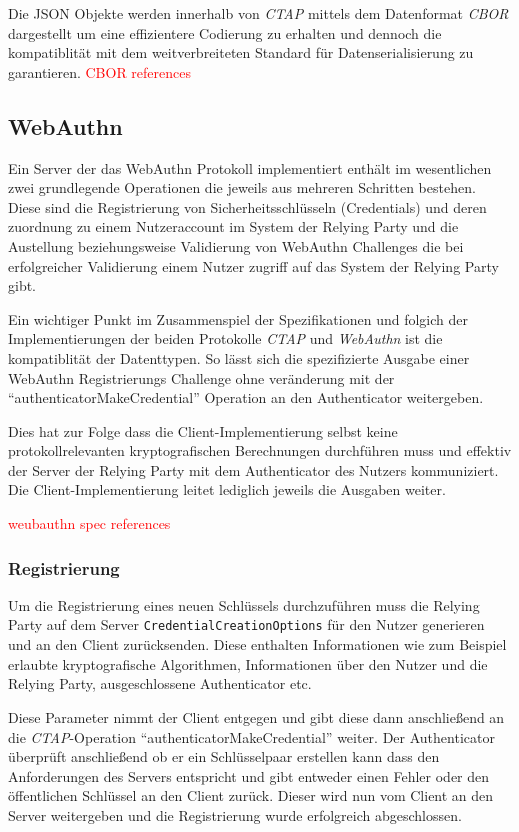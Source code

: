 \documentclass[journal]{IEEEtran}
\begin{document}
Die JSON Objekte werden innerhalb von \textit{CTAP} mittels dem Datenformat
\textit{CBOR} dargestellt um eine effizientere Codierung zu erhalten und
dennoch die kompatiblität mit dem weitverbreiteten Standard für
Datenserialisierung zu garantieren.
\textcolor{red}{CBOR references}

\subsection{WebAuthn}

Ein Server der das WebAuthn Protokoll implementiert enthält im wesentlichen
zwei grundlegende Operationen die jeweils aus mehreren Schritten bestehen.
Diese sind die Registrierung von Sicherheitsschlüsseln (Credentials) und deren
zuordnung zu einem Nutzeraccount im System der Relying Party und die
Austellung beziehungsweise Validierung von WebAuthn Challenges die bei
erfolgreicher Validierung einem Nutzer zugriff auf das System der Relying Party
gibt.

Ein wichtiger Punkt im Zusammenspiel der Spezifikationen und folgich der
Implementierungen der beiden Protokolle \textit{CTAP} und \textit{WebAuthn} ist
die kompatiblität der Datenttypen. So lässt sich die spezifizierte Ausgabe
einer WebAuthn Registrierungs Challenge ohne veränderung mit der
``authenticatorMakeCredential'' Operation an den Authenticator weitergeben.

Dies hat zur Folge dass die Client-Implementierung selbst keine
protokollrelevanten kryptografischen Berechnungen durchführen muss und effektiv
der Server der Relying Party mit dem Authenticator des Nutzers kommuniziert.
Die Client-Implementierung leitet lediglich jeweils die Ausgaben weiter.

\textcolor{red}{weubauthn spec references}

\subsubsection{Registrierung}

Um die Registrierung eines neuen Schlüssels durchzuführen muss die Relying
Party auf dem Server \texttt{CredentialCreationOptions} für den Nutzer
generieren und an den Client zurücksenden. Diese enthalten Informationen wie
zum Beispiel erlaubte kryptografische Algorithmen, Informationen über den
Nutzer und die Relying Party, ausgeschlossene Authenticator etc.

Diese Parameter nimmt der Client entgegen und gibt diese dann anschließend an
die \textit{CTAP}-Operation ``authenticatorMakeCredential'' weiter. Der
Authenticator überprüft anschließend ob er ein Schlüsselpaar erstellen kann
dass den Anforderungen des Servers entspricht und gibt entweder einen Fehler
oder den öffentlichen Schlüssel an den Client zurück. Dieser wird nun vom
Client an den Server weitergeben und die Registrierung wurde erfolgreich
abgeschlossen.
\end{document}
